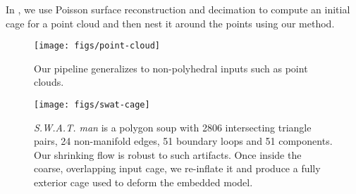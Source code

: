 In , we use Poisson surface reconstruction and decimation
to compute an initial cage for a point cloud and then nest it around the points
using our method.

\begin{figure}
  \texttt{[image: figs/point-cloud]}
  \caption{Our pipeline generalizes to non-polyhedral inputs such as point
  clouds.}
  \label{fig:point-cloud}
\end{figure}

\begin{figure}
  \texttt{[image: figs/swat-cage]}
  \caption{\emph{S.W.A.T. man} is a polygon soup with 2806 
  intersecting triangle pairs, 24 non-manifold edges, 51 boundary loops and 51
  components. Our shrinking flow is robust to such artifacts. Once
  inside the coarse, overlapping input cage, we re-inflate it and produce a
  fully exterior cage used to deform the embedded model.}
  \label{fig:swat-cage}
\end{figure}

